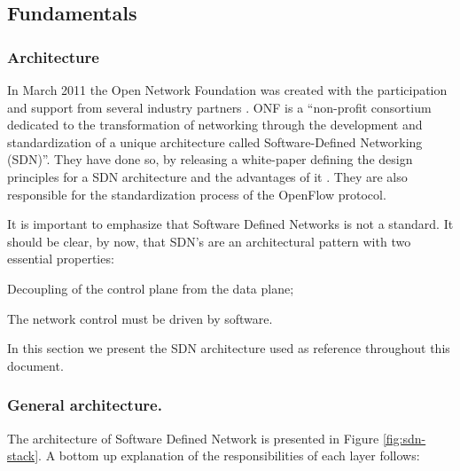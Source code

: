 \documentclass[12pt,openright,twoside]{report}
\begin{document}
\begin{itemize}
\begin{itemize}

\end{itemize}

\subsection{Fundamentals}

\subsubsection{Architecture}
In March 2011 the Open Network Foundation was created with the
participation and support from several industry partners \cite{onf}. ONF  is a ``non-profit consortium
dedicated to the transformation of networking through the development
and standardization of a unique architecture called Software-Defined
Networking (SDN)''. They have done so, by releasing a white-paper
defining the design principles for a SDN architecture and the
advantages of it \cite{ONF:2012ui}. They are also responsible for the standardization
process of the OpenFlow protocol.

It is important to emphasize that Software Defined Networks is not a
standard. It should be
clear, by now, that SDN's are an architectural pattern with two
essential properties:

\begin{itemize*}
\item Decoupling of the control plane from the data plane;
\item The network control must be driven by software.
\end{itemize*}

In this section we present the SDN architecture used as reference throughout this document.  

\subsubsection{General architecture.} The architecture of Software Defined Network is presented in Figure
\ref{fig:sdn-stack}. A bottom up explanation of the responsibilities of
each layer follows:


\end{itemize}
\end{document}
